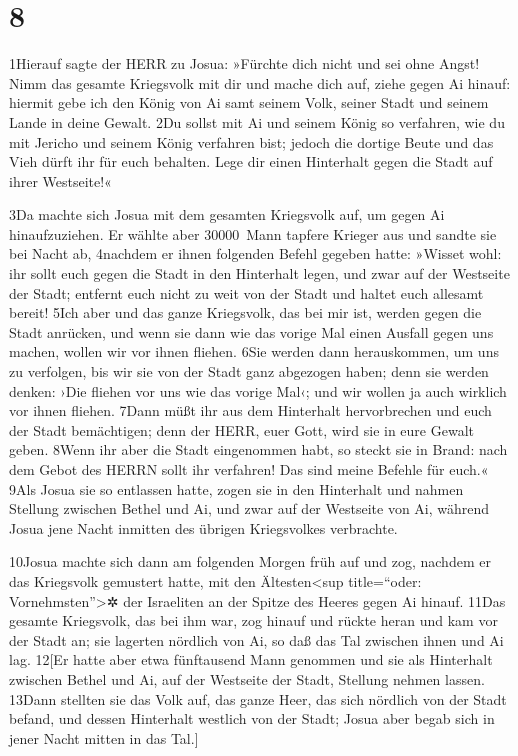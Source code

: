 \hypertarget{section-7}{%
\section{8}\label{section-7}}

1Hierauf sagte der HERR zu Josua: »Fürchte dich nicht und sei ohne
Angst! Nimm das gesamte Kriegsvolk mit dir und mache dich auf, ziehe
gegen Ai hinauf: hiermit gebe ich den König von Ai samt seinem Volk,
seiner Stadt und seinem Lande in deine Gewalt. 2Du sollst mit Ai und
seinem König so verfahren, wie du mit Jericho und seinem König verfahren
bist; jedoch die dortige Beute und das Vieh dürft ihr für euch behalten.
Lege dir einen Hinterhalt gegen die Stadt auf ihrer Westseite!«

3Da machte sich Josua mit dem gesamten Kriegsvolk auf, um gegen Ai
hinaufzuziehen. Er wählte aber 30000~Mann tapfere Krieger aus und sandte
sie bei Nacht ab, 4nachdem er ihnen folgenden Befehl gegeben hatte:
»Wisset wohl: ihr sollt euch gegen die Stadt in den Hinterhalt legen,
und zwar auf der Westseite der Stadt; entfernt euch nicht zu weit von
der Stadt und haltet euch allesamt bereit! 5Ich aber und das ganze
Kriegsvolk, das bei mir ist, werden gegen die Stadt anrücken, und wenn
sie dann wie das vorige Mal einen Ausfall gegen uns machen, wollen wir
vor ihnen fliehen. 6Sie werden dann herauskommen, um uns zu verfolgen,
bis wir sie von der Stadt ganz abgezogen haben; denn sie werden denken:
›Die fliehen vor uns wie das vorige Mal‹; und wir wollen ja auch
wirklich vor ihnen fliehen. 7Dann müßt ihr aus dem Hinterhalt
hervorbrechen und euch der Stadt bemächtigen; denn der HERR, euer Gott,
wird sie in eure Gewalt geben. 8Wenn ihr aber die Stadt eingenommen
habt, so steckt sie in Brand: nach dem Gebot des HERRN sollt ihr
verfahren! Das sind meine Befehle für euch.« 9Als Josua sie so entlassen
hatte, zogen sie in den Hinterhalt und nahmen Stellung zwischen Bethel
und Ai, und zwar auf der Westseite von Ai, während Josua jene Nacht
inmitten des übrigen Kriegsvolkes verbrachte.

10Josua machte sich dann am folgenden Morgen früh auf und zog, nachdem
er das Kriegsvolk gemustert hatte, mit den Ältesten\textless sup
title=``oder: Vornehmsten''\textgreater✲ der Israeliten an der Spitze
des Heeres gegen Ai hinauf. 11Das gesamte Kriegsvolk, das bei ihm war,
zog hinauf und rückte heran und kam vor der Stadt an; sie lagerten
nördlich von Ai, so daß das Tal zwischen ihnen und Ai lag. 12{[}Er hatte
aber etwa fünftausend Mann genommen und sie als Hinterhalt zwischen
Bethel und Ai, auf der Westseite der Stadt, Stellung nehmen lassen.
13Dann stellten sie das Volk auf, das ganze Heer, das sich nördlich von
der Stadt befand, und dessen Hinterhalt westlich von der Stadt; Josua
aber begab sich in jener Nacht mitten in das Tal.{]}

